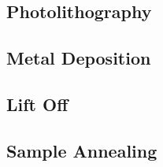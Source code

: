 \subsection{Photolithography}\label{subsec:photo_lithography}
\subsection{Metal Deposition}\label{subsec:metal_deposition}
\subsection{Lift Off}\label{subsec:lift_off}
\subsection{Sample Annealing}\label{subsec:annealing}
